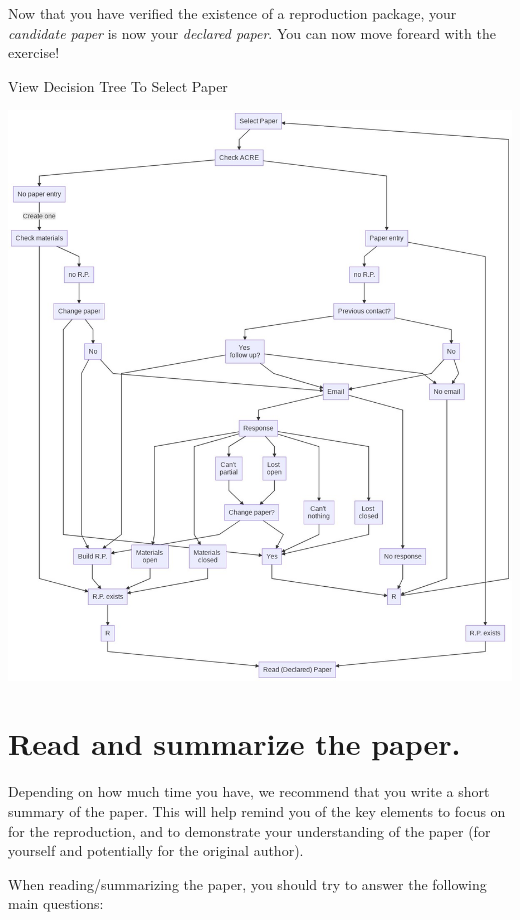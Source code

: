 \documentclass[]{book}
\begin{document}
Now that you have verified the existence of a reproduction package, your \emph{candidate paper} is now your \emph{declared paper}. You can now move foreard with the exercise!

View Decision Tree To Select Paper

\includegraphics{candidate-paper.jpeg}

\hypertarget{read-sum}{%
\section{Read and summarize the paper.}\label{read-sum}}

Depending on how much time you have, we recommend that you write a short summary of the paper. This will help remind you of the key elements to focus on for the reproduction, and to demonstrate your understanding of the paper (for yourself and potentially for the original author).

When reading/summarizing the paper, you should try to answer the following main questions:
\end{document}
